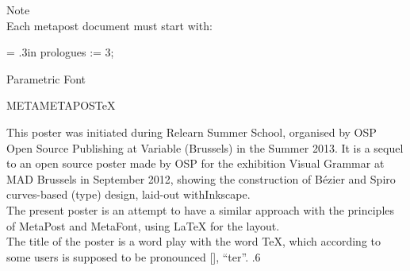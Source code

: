 \documentclass[danish,a2paper,11pt]{scrartcl}
\begin{document}
\begin{multicols*}{3}
\vspace{2cm}

\color{White}
\romansmall
Note\\
\vspace{.4cm}
\color{Black}
Each metapost document must start with:\\
{\leftskip = .3in
\typewritersmall
prologues := 3;     %
\par}

\columnbreak

Parametric Font



\end{multicols*}

\pagebreak



\begin{center}
\color{White}
\normalfont\logofamily
\Huge METAMETAPOS\TeX
\end{center}

\metaessay
\noindent
This poster was initiated during Relearn Summer School, organised by OSP Open Source Publishing at Variable (Brussels) in the Summer 2013. 
It is a sequel to an open source poster made by OSP for the exhibition Visual Grammar at MAD Brussels in September 2012, showing the construction of Bézier and Spiro curves-based (type) design, laid-out with\vbox{Inkscape.}\\
The present poster is an attempt to have a similar approach with the principles of MetaPost and MetaFont, using \fontsize{100pt}{38pt}\LaTeX{} for the layout.\\
The title of the poster is a word play with the word \fontsize{100pt}{38pt}\TeX{}, which according to some users is supposed to be pronounced [], “ter”.
\openup .6 \baselineskip %
\end{document}
